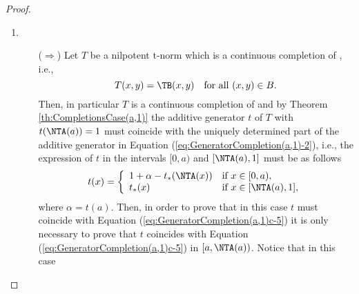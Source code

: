 \begin{proof}
\begin{enumerate}[label=(\roman*)]
\begin{itemize}
\begin{itemize}
\begin{itemize}
				\end{itemize}
				Then, by Equation (\ref{eq:alpha:c4}) and $\beta=t(c)$ we obtain
				$$\alpha=t(a) = (n_c-1)\beta+t_*(h_c^{-n_c+1}(a)),$$
				and we have proved that $t$ is given by Equation (\ref{eq:GeneratorCompletion(a,1)c-4}).
			\end{itemize}
			\item[($\Leftarrow$)] Similar to the proof of Case (v).
		\end{itemize}
		Finally, let us distinguish between the cases $c=h_{c}^{-n_c+2}(\NTB(c))$ and $c<h_{c}^{-n_c+2}(\NTB(c))$:
		\begin{itemize}
			\item If $c=h_{c}^{-n_c+2}(\NTB(c))$ then the domain of any function $\overline{t}: [c,h_c^{-n_c+2}(\NTB(c))] \to [0,1]$ is only one point and the corresponding value must be fixed by $\overline{t}(c)=\overline{t}(h_c^{-n_c+2}(\NTB(c))) = 1 + t_*(h_c^{-n_c+1}(a))$. Then, in this case \TB has a unique continuous completion.
			\item If $c<h_{c}^{-n_c+2}(\NTB(c))$ then the domain of any function $\overline{t}: [c,h_c^{-n_c+2}(\NTB(c))] \to [0,1]$ is a whole interval and the values of $t$ on $[c,h_c^{-n_c+2}(\NTB(c)))$ can be arbitrary with the restriction that $\overline{t}$ must be a continuous, strictly decreasing function with $\overline{t}(c) \in (1 + t_*(h_c^{-n_c+1}(a)),+\infty)$. Then, in this case \TB has infinitely many continuous completions.
		\end{itemize}
		\item ~~
		\begin{itemize}
			\item[($\Rightarrow$)] Let $T$ be a nilpotent t-norm which is a continuous completion of \TB, i.e.,
			$$T(x,y)=\TB(x,y) \quad \text{for all } (x,y) \in B.$$
			Then, in particular $T$ is a continuous completion of \TA and by Theorem \ref{th:CompletionsCase(a,1)} the additive generator $t$ of $T$ with $t(\NTA(a))=1$ must coincide with the uniquely determined part of the additive generator in Equation (\ref{eq:GeneratorCompletion(a,1)-2}), i.e., the expression of $t$ in the intervals $[0,a)$ and $[\NTA(a),1]$ must be as follows
			$$
			t(x)
			=
			\left\{ \begin{array}{ll}
				1+\alpha-t_{*}(\NTA(x)) & \text{if } x \in [0,a), \\
				t_{*}(x) & \text{if } x \in [\NTA(a),1],
			\end{array} \right.
			$$
			where $\alpha=t(a)$. Then, in order to prove that in this case $t$ must coincide with Equation (\ref{eq:GeneratorCompletion(a,1)c-5}) it is only necessary to prove that $t$ coincides with Equation  (\ref{eq:GeneratorCompletion(a,1)c-5}) in $[a,\NTA(a))$. Notice that in this case

\end{itemize}
\end{enumerate}
\end{proof}
